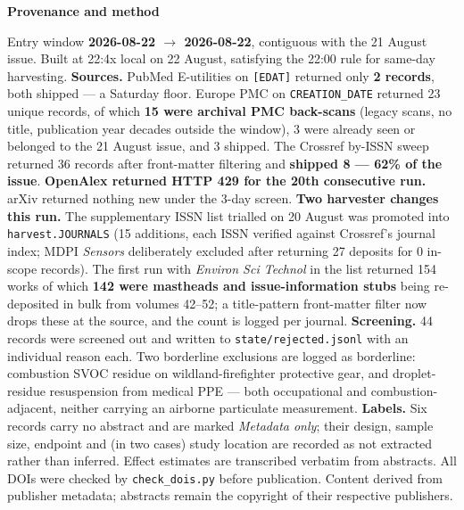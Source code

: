 \documentclass[10pt]{article}
\begin{document}
\vspace{4mm}
\begin{keybox}
{\sffamily\bfseries\footnotesize\color{Deep}Provenance and method}\\[1.2mm]
{\fontsize{7.2}{8.8}\selectfont
Entry window \textbf{2026-08-22 $\rightarrow$ 2026-08-22}, contiguous with the 21 August
issue. Built at 22:4x local on 22 August, satisfying the 22:00 rule for same-day
harvesting. \textbf{Sources.} PubMed E-utilities on \texttt{[EDAT]} returned only
\textbf{2 records}, both shipped --- a Saturday floor. Europe PMC on
\texttt{CREATION\_DATE} returned 23 unique records, of which \textbf{15 were archival PMC
back-scans} (legacy scans, no title, publication year decades outside the window), 3 were
already seen or belonged to the 21 August issue, and 3 shipped. The Crossref by-ISSN
sweep returned 36 records after front-matter filtering and \textbf{shipped 8 --- 62\% of
the issue}. \textbf{OpenAlex returned HTTP 429 for the 20th consecutive run.} arXiv
returned nothing new under the 3-day screen.
\textbf{Two harvester changes this run.} The supplementary ISSN list trialled on 20 August
was promoted into \texttt{harvest.JOURNALS} (15 additions, each ISSN verified against
Crossref's journal index; MDPI \textit{Sensors} deliberately excluded after returning 27
deposits for 0 in-scope records). The first run with \textit{Environ Sci Technol} in the
list returned 154 works of which \textbf{142 were mastheads and issue-information stubs}
being re-deposited in bulk from volumes 42--52; a title-pattern front-matter filter now
drops these at the source, and the count is logged per journal.
\textbf{Screening.} 44 records were screened out and written to
\texttt{state/rejected.jsonl} with an individual reason each. Two borderline exclusions
are logged as borderline: combustion SVOC residue on wildland-firefighter protective gear,
and droplet-residue resuspension from medical PPE --- both occupational and
combustion-adjacent, neither carrying an airborne particulate measurement.
\textbf{Labels.} Six records carry no abstract and are marked \textit{Metadata only};
their design, sample size, endpoint and (in two cases) study location are recorded as not
extracted rather than inferred. Effect estimates are transcribed verbatim from abstracts.
All DOIs were checked by \texttt{check\_dois.py} before publication. Content derived from
publisher metadata; abstracts remain the copyright of their respective publishers.\par}
\end{keybox}
\end{document}
